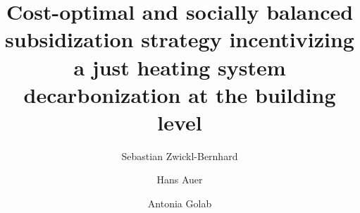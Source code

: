 \documentclass[review]{elsarticle}
\begin{document}
\begin{frontmatter}

\title{Cost-optimal and socially balanced subsidization strategy incentivizing a just heating system decarbonization at the building level}
\author[1]{Sebastian Zwickl-Bernhard}
\author[1]{Hans Auer}
\author[1]{Antonia Golab}
\address[1]{Energy Economics Group (EEG), Technische Universität Wien, Gusshausstrasse 25-29/E370-3, 1040 Wien, Austria}

\begin{abstract}

\end{abstract}

\begin{keyword}
	
\end{keyword}
\end{frontmatter}

\newpage
\end{document}
